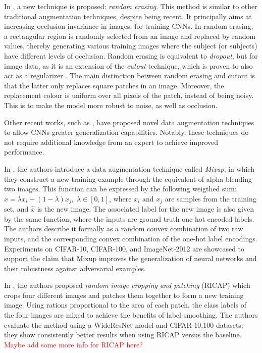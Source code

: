 \documentclass[a4paper,11pt]{article}
\begin{document}
In \cite{zhong2020random}, a new technique is proposed: \textit{random erasing}. This method is similar to other traditional augmentation techniques, despite being recent. It principally aims at increasing occlusion invariance in images, for training CNNs. In random erasing, a rectangular region is randomly selected from an image and replaced by random values, thereby generating various training images where the subject (or subjects) have different levels of occlusion. Random erasing is equivalent to \textit{dropout}, but for image data, as it is an extension of the \textit{cutout} technique, which is proven to also act as a regularizer \cite{cutout}. The main distinction between random erasing and cutout is that the latter only replaces square patches in an image. Moreover, the replacement colour is uniform over all pixels of the patch, instead of being noisy. This is to make the model more robust to noise, as well as occlusion.

Other recent works, such as \cite{zhang2017mixup, takahashi2018ricap}, have proposed novel data augmentation techniques to allow CNNs greater generalization capabilities. Notably, these techniques do not require additional knowledge from an expert to achieve improved performance.

In \cite{zhang2017mixup}, the authors introduce a data augmentation technique called \textit{Mixup}, in which they construct a new training example through the equivalent of alpha blending two images. This function can be expressed by the following weigthed sum: $\hat{x} = \lambda x_i + (1 - \lambda) x_j, \; \lambda \in [0,1]$, where $x_i$ and $x_j$ are samples from the training set, and $\hat{x}$ is the new image. The associated label for the new image is also given by the same function, where the inputs are ground truth one-hot encoded labels. The authors describe it formally as a random convex combination of two raw inputs, and the corresponding convex combination of the one-hot label encodings. Experiments on CIFAR-10, CIFAR-100, and ImageNet-2012 are showcased to support the claim that Mixup improves the generalization of neural networks and their robustness against adversarial examples.

In \cite{takahashi2018ricap}, the authors proposed \textit{random image cropping and patching} (RICAP) which crops four different images and patches them together to form a new training image. Using rations proportional to the area of each patch, the class labels of the four images are mixed to achieve the benefits of label smoothing. The authors evaluate the method using a WideResNet model and CIFAR-{10,100} datasets; they show consistently better results when using RICAP versus the baseline. \textcolor{red}{Maybe add some more info for RICAP here?}
\end{document}
